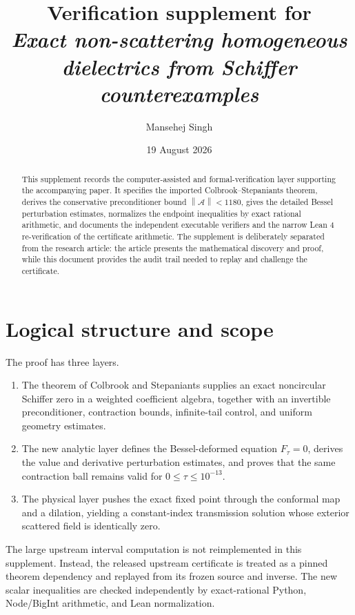 \documentclass[11pt]{amsart}
\title[Verification supplement]
{Verification supplement for\\
\emph{Exact non-scattering homogeneous dielectrics from Schiffer counterexamples}}
\author{Mansehej Singh}
\date{19 August 2026}
\newcommand{\norm}[1]{\left\lVert #1\right\rVert}
\begin{document}
\begin{abstract}
This supplement records the computer-assisted and formal-verification layer
supporting the accompanying paper.  It specifies the imported
Colbrook--Stepaniants theorem, derives the conservative preconditioner bound
$\norm{\mathcal A}<1180$, gives the detailed Bessel perturbation estimates,
normalizes the endpoint inequalities by exact rational arithmetic, and
documents the independent executable verifiers and the narrow Lean 4
re-verification of the certificate arithmetic.
The supplement is deliberately separated from the research article: the
article presents the mathematical discovery and proof, while this document
provides the audit trail needed to replay and challenge the certificate.
\end{abstract}

\maketitle

\section{Logical structure and scope}

The proof has three layers.
\begin{enumerate}[label=\textup{(\roman*)},leftmargin=2.2em]
  \item The theorem of Colbrook and Stepaniants
  \cite{ColbrookStepaniants2026} supplies an exact noncircular Schiffer zero
  in a weighted coefficient algebra, together with an invertible
  preconditioner, contraction bounds, infinite-tail control, and uniform
  geometry estimates.
  \item The new analytic layer defines the Bessel-deformed equation
  $F_\tau=0$, derives the value and derivative perturbation estimates, and
  proves that the same contraction ball remains valid for
  $0\le\tau\le10^{-13}$.
  \item The physical layer pushes the exact fixed point through the conformal
  map and a dilation, yielding a constant-index transmission solution whose
  exterior scattered field is identically zero.
\end{enumerate}

The large upstream interval computation is not reimplemented in this
supplement.  Instead, the released upstream certificate is treated as a
pinned theorem dependency and replayed from its frozen source and inverse.
The new scalar inequalities are checked independently by exact-rational
Python, Node/BigInt arithmetic, and Lean normalization.
\end{document}
